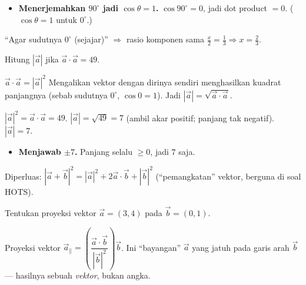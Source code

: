 \begin{jebakan}
\begin{itemize}[leftmargin=*,topsep=2pt]
  \item \textbf{Menerjemahkan $90^\circ$ jadi $\cos\theta=1$.}
  $\cos90^\circ=0$, jadi dot product $=0$. ($\cos\theta=1$ untuk $0^\circ$.)
\end{itemize}
\end{jebakan}

\begin{variasi}
``Agar sudutnya $0^\circ$ (sejajar)'' $\Rightarrow$ rasio komponen sama
$\frac x2=\frac13\Rightarrow x=\frac23$.
\end{variasi}

\begin{soalbox}{}
Hitung $|\vec a|$ jika $\vec a\cdot\vec a=49$.
\end{soalbox}

\begin{ingat}{$\vec a\cdot\vec a=|\vec a|^2$}
Mengalikan vektor dengan dirinya sendiri menghasilkan kuadrat panjangnya (sebab
sudutnya $0^\circ$, $\cos0=1$). Jadi $|\vec a|=\sqrt{\vec a\cdot\vec a}$.
\end{ingat}

\jawab
{} $|\vec a|^2=\vec a\cdot\vec a=49$.
 $|\vec a|=\sqrt{49}=7$ (ambil akar positif; panjang tak negatif).
\jadi $|\vec a|=7$.

\begin{jebakan}
\begin{itemize}[leftmargin=*,topsep=2pt]
  \item \textbf{Menjawab $\pm7$.} Panjang selalu $\ge0$, jadi $7$ saja.
\end{itemize}
\end{jebakan}

\begin{variasi}
Diperluas: $|\vec a+\vec b|^2=|\vec a|^2+2\vec a\cdot\vec b+|\vec b|^2$
(``pemangkatan'' vektor, berguna di soal HOTS).
\end{variasi}

\begin{soalbox}{}
Tentukan proyeksi vektor $\vec a=(3,4)$ pada $\vec b=(0,1)$.
\end{soalbox}

\begin{ingat}{Proyeksi vektor}
$\vec a_\parallel=\left(\dfrac{\vec a\cdot\vec b}{|\vec b|^2}\right)\vec b$. Ini
``bayangan'' $\vec a$ yang jatuh pada garis arah $\vec b$ --- hasilnya sebuah
\emph{vektor}, bukan angka.
\end{ingat}

